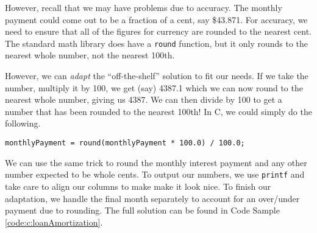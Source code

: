 However, recall that we may have problems due to accuracy.  The monthly
payment could come out to be a fraction of a cent, say \$43.871.  For 
accuracy, we need to ensure that all of the figures for currency are rounded
to the nearest cent.  The standard math library does have a \texttt{round}
function, but it only rounds to the nearest whole number, not the nearest
100th.

However, we can \emph{adapt} the ``off-the-shelf'' solution to fit our needs.  
If we take the number, multiply it by 100, we get (say) 4387.1 which we can
now round to the nearest whole number, giving us 4387.  We can then 
divide by 100 to get a number that has been rounded to the nearest 100th!
In C, we could simply do the following.

\texttt{monthlyPayment = round(monthlyPayment * 100.0) / 100.0;}

We can use the same trick to round the monthly interest payment and any
other number expected to be whole cents.  To output our numbers, we use
\texttt{printf} and take care to align our columns to make make it look 
nice.  To finish our adaptation, we handle the final month separately to account
for an over/under payment due to rounding.  The full solution can be found
in Code Sample \ref{code:c:loanAmortization}.

